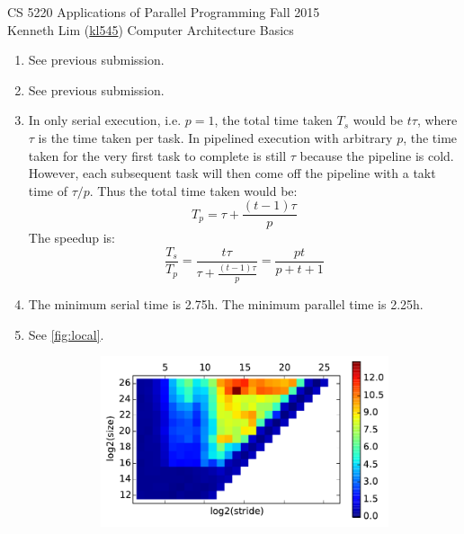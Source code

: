 \documentclass{scrartcl}
\begin{document}
  \begin{framed}
  \large
  CS 5220 Applications of Parallel Programming \hfill Fall 2015 \\
  Kenneth Lim (\href{mailto:kl545@cornell.edu}{kl545}) \hfill Computer Architecture Basics \hspace{-3ex}
  \end{framed}
  \begin{enumerate}
    \item See previous submission.
    \item See previous submission.
    \item In only serial execution, i.e. $p = 1$, the total time taken $T_s$ would be $t\tau$, where $\tau$ is the time taken per task. In pipelined execution with arbitrary $p$, the time taken for the very first task to complete is still $\tau$ because the pipeline is cold. However, each subsequent task will then come off the pipeline with a takt time of $\tau/p$. Thus the total time taken would be:
    \[
      T_p = \tau + \frac{(t-1)\tau}{p}
    \]
    The speedup is:
    \[
      \frac{T_s}{T_p} = \frac{t\tau}{\tau + \frac{(t-1)\tau}{p}} = \frac{pt}{p+t+1}
    \]
    \item The minimum serial time is 2.75h. The minimum parallel time is 2.25h.
    \item See \autoref{fig:local}.
      \begin{figure}[ht!]
        \centering
        \begin{subfigure}[c]{.5\textwidth}
          \centering
          \includegraphics{local-timings-heat}
        \end{subfigure}%
        \begin{subfigure}[c]{.5\textwidth}
          \centering

\end{subfigure}
\end{figure}
\end{enumerate}
\end{document}
